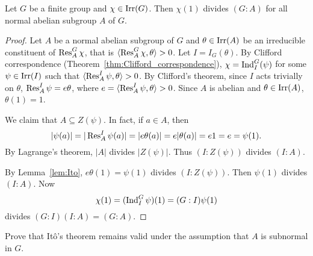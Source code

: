 \begin{theorem}[It\^o]
\label{thm:Ito}
Let $G$ be a finite group and $\chi\in\operatorname{Irr}(G)$. Then 
$\chi(1)$ divides $(G:A)$ for all normal abelian subgroup $A$ of $G$.  
\end{theorem}

\begin{proof}
    Let $A$ be a normal abelian subgroup of $G$ and 
    $\theta\in\operatorname{Irr}(A)$ be an irreducible constituent of $\operatorname{Res}_A^G\chi$, that 
    is $\langle\operatorname{Res}_A^G\chi,\theta\rangle>0$. Let $I=I_G(\theta)$. 
    By Clifford correspondence (Theorem~\ref{thm:Clifford_correspondence}), 
    $\chi=\operatorname{Ind}_I^G(\psi)$ for some $\psi\in\operatorname{Irr}(I)$ such that 
    $\langle\operatorname{Res}_A^I\psi,\theta\rangle>0$. By Clifford's theorem, since 
    $I$ acts trivially on $\theta$, 
    $\operatorname{Res}_A^I\psi=e\theta$, where $e=\langle\operatorname{Res}_A^I\psi,\theta\rangle>0$. Since $A$ is abelian and
    $\theta\in\operatorname{Irr}(A)$, $\theta(1)=1$. 
    
    We claim that $A\subseteq Z(\psi)$. In fact, if $a\in A$, then 
    \[
    |\psi(a)|=|\operatorname{Res}_A^I\psi(a)|=|e\theta(a)|=e|\theta(a)|=e1=e=\psi(1).
    \]
    By Lagrange's theorem, $|A|$ divides $|Z(\psi)|$. Thus $(I:Z(\psi))$ divides $(I:A)$. 

    By Lemma~\ref{lem:Ito}, 
    $e\theta(1)=\psi(1)$ divides $(I:Z(\psi))$. Then 
    $\psi(1)$ divides $(I:A)$. Now 
    \[
    \chi(1)=(\operatorname{Ind}_I^G\psi)(1)=(G:I)\psi(1)
    \]
    divides $(G:I)(I:A)=(G:A)$.
\end{proof}

\begin{bonus}
    \label{xca:Reynolds}
	Prove that Itô’s theorem remains valid under the assumption that $A$ is subnormal in $G$.
\end{bonus}


